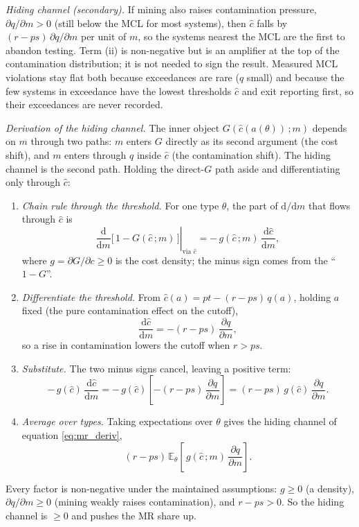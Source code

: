 \documentclass{article}
\begin{document}
\emph{Hiding channel (secondary).} If mining also raises contamination pressure, $\partial q/\partial m > 0$ (still below the MCL for most systems), then $\hat{c}$ falls by $(r-ps)\,\partial q/\partial m$ per unit of $m$, so the systems nearest the MCL are the first to abandon testing. Term (ii) is non-negative but is an amplifier at the top of the contamination distribution; it is not needed to sign the result. Measured MCL violations stay flat both because exceedances are rare ($q$ small) and because the few systems in exceedance have the lowest thresholds $\hat{c}$ and exit reporting first, so their exceedances are never recorded.

\emph{Derivation of the hiding channel.} The inner object $G(\hat{c}(a(\theta))\,;m)$ depends on $m$ through two paths: $m$ enters $G$ directly as its second argument (the cost shift), and $m$ enters through $q$ inside $\hat{c}$ (the contamination shift). The hiding channel is the second path. Holding the direct-$G$ path aside and differentiating only through $\hat{c}$:
\begin{enumerate}
\item \emph{Chain rule through the threshold.} For one type $\theta$, the part of $\mathrm{d}/\mathrm{d}m$ that flows through $\hat{c}$ is
\[ \left.\frac{\mathrm{d}}{\mathrm{d}m}\big[\,1 - G(\hat{c}\,;m)\,\big]\right|_{\text{via }\hat{c}} = -\,g(\hat{c}\,;m)\,\frac{\mathrm{d}\hat{c}}{\mathrm{d}m}, \]
where $g = \partial G/\partial c \ge 0$ is the cost density; the minus sign comes from the ``$1-G$''.
\item \emph{Differentiate the threshold.} From $\hat{c}(a) = pt - (r-ps)\,q(a)$, holding $a$ fixed (the pure contamination effect on the cutoff),
\[ \frac{\mathrm{d}\hat{c}}{\mathrm{d}m} = -(r-ps)\,\frac{\partial q}{\partial m}, \]
so a rise in contamination lowers the cutoff when $r>ps$.
\item \emph{Substitute.} The two minus signs cancel, leaving a positive term:
\[ -\,g(\hat{c})\,\frac{\mathrm{d}\hat{c}}{\mathrm{d}m} = -\,g(\hat{c})\left[-(r-ps)\,\frac{\partial q}{\partial m}\right] = (r-ps)\,g(\hat{c})\,\frac{\partial q}{\partial m}. \]
\item \emph{Average over types.} Taking expectations over $\theta$ gives the hiding channel of equation \ref{eq:mr_deriv},
\[ (r-ps)\,\mathbb{E}_\theta\!\left[\,g(\hat{c}\,;m)\,\frac{\partial q}{\partial m}\right]. \]
\end{enumerate}
Every factor is non-negative under the maintained assumptions: $g \ge 0$ (a density), $\partial q/\partial m \ge 0$ (mining weakly raises contamination), and $r-ps>0$. So the hiding channel is $\ge 0$ and pushes the MR share up.
\end{document}
